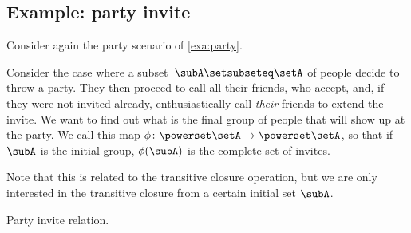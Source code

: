 \subsection{Example: party invite}

Consider again the party scenario of \cref{exa:party}.

Consider the case where a subset~$\subA \setsubseteq \setA$ of people decide to throw a party.
They then proceed to call all their friends, who accept, and,
if they were not invited already, enthusiastically call \emph{their} friends to extend the invite.
We want to find out what is the final group of people that will show up at the party.
We call this map $\phi \colon \powerset \setA \to \powerset \setA$, so that if $\subA$ is the initial group, $\phi(\subA)$ is the complete set of invites.

Note that this is related to the transitive closure operation, but we are only interested in the transitive closure from a certain initial set $\subA$.

\begin{marginfigure}
    \caption{Party invite relation.}
    \label{fig:party_invite_dp}
\end{marginfigure}


